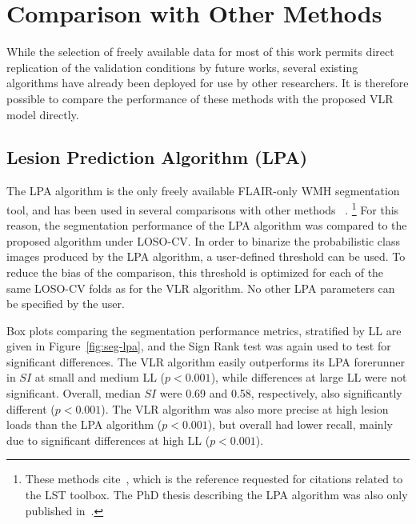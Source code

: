 \section{Comparison with Other Methods}
While the selection of freely available data for most of this work
permits direct replication of the validation conditions by future works,
several existing algorithms have already been deployed for use by other researchers.
It is therefore possible to compare the performance of these methods with
the proposed VLR model directly.
\subsection{Lesion Prediction Algorithm (LPA)}\label{ss:exp-lpa}
The LPA algorithm is the only freely available FLAIR-only WMH segmentation tool,
and has been used in several comparisons with other methods%
~\cite{Egger2017,Griffanti2016,Brosch2016}.%
\footnote{These methods cite~\cite{Schmidt2012},
  which is the reference requested for citations related to the LST toolbox.
  The PhD thesis describing the LPA algorithm was also only published in~\citeyear{Schmidt2017}.}
For this reason, the segmentation performance of the LPA algorithm
was compared to the proposed algorithm under LOSO-CV.
In order to binarize the probabilistic class images produced by the LPA algorithm,
a user-defined threshold can be used.
To reduce the bias of the comparison,
this threshold is optimized for each of the same LOSO-CV folds as for the VLR algorithm.
No other LPA parameters can be specified by the user.
\par
Box plots comparing the segmentation performance metrics, stratified by LL
are given in Figure~\ref{fig:seg-lpa}, and
the Sign Rank test was again used to test for significant differences.
The VLR algorithm easily outperforms its LPA forerunner
in $SI$ at small and medium LL ($p < 0.001$),
while differences at large LL were not significant.
Overall, median $SI$ were 0.69 and 0.58, respectively, also significantly different ($p < 0.001$).
The VLR algorithm was also more precise at high lesion loads than the LPA algorithm ($p < 0.001$),
but overall had lower recall, mainly due to significant differences at high LL ($p < 0.001$).
\par
